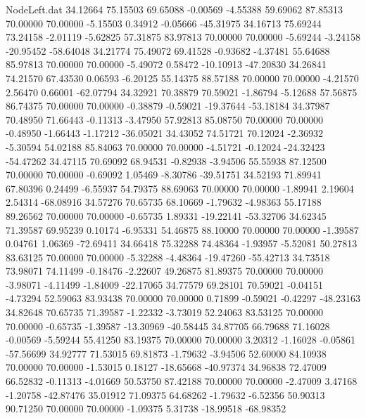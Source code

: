 \begin{filecontents}{NodeLeft.dat}
  34.12664   75.15503   69.65088    -0.00569   -4.55388   59.69062   87.85313   70.00000   70.00000   -5.15503    0.34912   -0.05666  -45.31975
  34.16713   75.69244   73.24158    -2.01119   -5.62825   57.31875   83.97813   70.00000   70.00000   -5.69244   -3.24158  -20.95452  -58.64048
  34.21774   75.49072   69.41528    -0.93682   -4.37481   55.64688   85.97813   70.00000   70.00000   -5.49072    0.58472  -10.10913  -47.20830
  34.26841   74.21570   67.43530     0.06593   -6.20125   55.14375   88.57188   70.00000   70.00000   -4.21570    2.56470    0.66001  -62.07794
  34.32921   70.38879   70.59021    -1.86794   -5.12688   57.56875   86.74375   70.00000   70.00000   -0.38879   -0.59021  -19.37644  -53.18184
  34.37987   70.48950   71.66443    -0.11313   -3.47950   57.92813   85.08750   70.00000   70.00000   -0.48950   -1.66443   -1.17212  -36.05021
  34.43052   74.51721   70.12024    -2.36932   -5.30594   54.02188   85.84063   70.00000   70.00000   -4.51721   -0.12024  -24.32423  -54.47262
  34.47115   70.69092   68.94531    -0.82938   -3.94506   55.55938   87.12500   70.00000   70.00000   -0.69092    1.05469   -8.30786  -39.51751
  34.52193   71.89941   67.80396     0.24499   -6.55937   54.79375   88.69063   70.00000   70.00000   -1.89941    2.19604    2.54314  -68.08916
  34.57276   70.65735   68.10669    -1.79632   -4.98363   55.17188   89.26562   70.00000   70.00000   -0.65735    1.89331  -19.22141  -53.32706
  34.62345   71.39587   69.95239     0.10174   -6.95331   54.46875   88.10000   70.00000   70.00000   -1.39587    0.04761    1.06369  -72.69411
  34.66418   75.32288   74.48364    -1.93957   -5.52081   50.27813   83.63125   70.00000   70.00000   -5.32288   -4.48364  -19.47260  -55.42713
  34.73518   73.98071   74.11499    -0.18476   -2.22607   49.26875   81.89375   70.00000   70.00000   -3.98071   -4.11499   -1.84009  -22.17065
  34.77579   69.28101   70.59021    -0.04151   -4.73294   52.59063   83.93438   70.00000   70.00000    0.71899   -0.59021   -0.42297  -48.23163
  34.82648   70.65735   71.39587    -1.22332   -3.73019   52.24063   83.53125   70.00000   70.00000   -0.65735   -1.39587  -13.30969  -40.58445
  34.87705   66.79688   71.16028    -0.00569   -5.59244   55.41250   83.19375   70.00000   70.00000    3.20312   -1.16028   -0.05861  -57.56699
  34.92777   71.53015   69.81873    -1.79632   -3.94506   52.60000   84.10938   70.00000   70.00000   -1.53015    0.18127  -18.65668  -40.97374
  34.96838   72.47009   66.52832    -0.11313   -4.01669   50.53750   87.42188   70.00000   70.00000   -2.47009    3.47168   -1.20758  -42.87476
  35.01912   71.09375   64.68262    -1.79632   -6.52356   50.90313   90.71250   70.00000   70.00000   -1.09375    5.31738  -18.99518  -68.98352

\end{filecontents}
